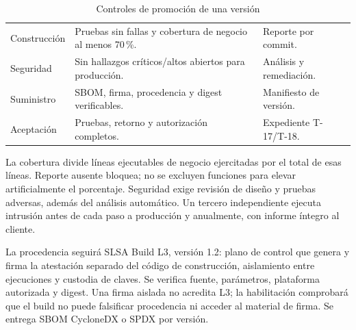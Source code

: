 \begin{table}[htbp]
\caption{Controles de promoción de una versión}\label{tab:sd6-puertas}
\begin{tabularx}{\linewidth}{L{.24\linewidth}Y L{.23\linewidth}}
\hline
{} &  & \\\hline
{} Construcción & Pruebas sin fallas y cobertura de negocio al menos 70\,\%. & Reporte por commit.\\\hline
Seguridad & Sin hallazgos críticos/altos abiertos para producción. & Análisis y remediación.\\\hline
{} Suministro & SBOM, firma, procedencia y digest verificables. & Manifiesto de versión.\\\hline
Aceptación & Pruebas, retorno y autorización completos. & Expediente T-17/T-18.\\\hline
\end{tabularx}
\end{table}
La cobertura divide líneas ejecutables de negocio ejercitadas por el total de esas líneas. Reporte ausente bloquea; no se excluyen funciones para elevar artificialmente el porcentaje. Seguridad exige revisión de diseño y pruebas adversas, además del análisis automático. Un tercero independiente ejecuta intrusión antes de cada paso a producción y anualmente, con informe íntegro al cliente. \parencite[RT-04.11, p.~11; RT-11.20/22, p.~24; cap.~20, p.~34]{sd6-bt}

La procedencia seguirá SLSA Build L3, versión 1.2: plano de control que genera y firma la atestación separado del código de construcción, aislamiento entre ejecuciones y custodia de claves. Se verifica fuente, parámetros, plataforma autorizada y digest. Una firma aislada no acredita L3; la habilitación comprobará que el build no puede falsificar procedencia ni acceder al material de firma. Se entrega SBOM CycloneDX o SPDX por versión. \parencites{sd6-slsa,sd6-slsa-requisitos}[RT-11.23/24, p.~24]{sd6-bt}

